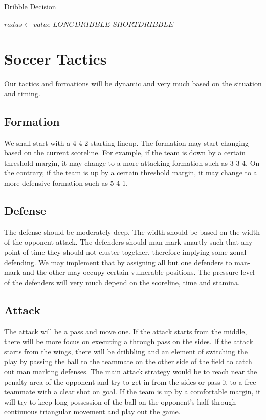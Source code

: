 \documentclass[conference,letterpaper]{IEEEtran}
\begin{document}
\begin{algorithm}[H]
\caption{Dribble Decision}\label{dribble}
\begin{algorithmic}[1]
\State $radus \gets value$
\State $LONGDRIBBLE$
\Else
\State $SHORTDRIBBLE$
\EndIf
\EndFor
\EndProcedure
\end{algorithmic}
\end{algorithm}

\section{\textbf{Soccer Tactics}}

Our tactics and formations will be dynamic and very much based on the situation and timing.

\subsection{\bf{Formation}}

We shall start with a 4-4-2 starting lineup. 
The formation may start changing based on the current scoreline. For example, if the team is down by a certain threshold margin, it may change to a more attacking formation such as 3-3-4. On the contrary, if the team is up by a certain threshold margin, it may change to a more defensive formation such as 5-4-1.


\subsection{\bf{Defense}}

The defense should be moderately deep. The width should be based on the width of the opponent attack. The defenders should man-mark smartly such that any point of time they should not cluster together, therefore implying some zonal defending. We may implement that by assigning all but one defenders to man-mark and the other may occupy certain vulnerable positions. The pressure level of the defenders will very much depend on the scoreline, time and stamina.

\subsection{\bf{Attack}}

The attack will be a pass and move one. If the attack starts from the middle, there will be more focus on executing a through pass on the sides. If the attack starts from the wings, there will be dribbling and an element of switching the play by passing the ball to the teammate on the other side of the field to catch out man marking defenses. The main attack strategy would be to reach near the penalty area of the opponent and try to get in from the sides or pass it to a free teammate with a clear shot on goal. If the team is up by a comfortable margin, it will try to keep long possession of the ball on the opponent’s half through continuous triangular movement and play out the game.


 

\end{document}
